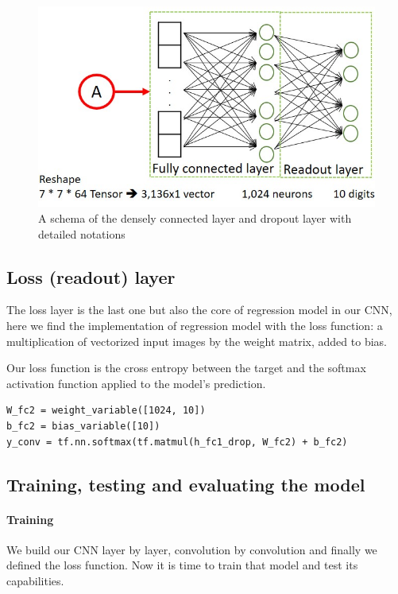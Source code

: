 \begin{figure}
	\caption{A schema of the densely connected layer and dropout layer with detailed notations}
	\label{fig:other_layers}
	\centering
	\includegraphics[width=1\textwidth]{Images/other_layers}
\end{figure}

\subsection{Loss (readout) layer}

The loss layer is the last one but also the core of regression model in our \acs{CNN}, here we find the implementation of regression model with the loss function: a multiplication of vectorized input images by the weight matrix, added to bias.

Our loss function is the cross entropy between the target and the softmax activation function applied to the model's prediction.

\begin{lstlisting}
W_fc2 = weight_variable([1024, 10])
b_fc2 = bias_variable([10])
y_conv = tf.nn.softmax(tf.matmul(h_fc1_drop, W_fc2) + b_fc2)
\end{lstlisting}

\subsection{Training, testing and evaluating the model}

\paragraph{Training}

We build our \acs{CNN} layer by layer, convolution by convolution and finally we defined the loss function. Now it is time to train that model and test its capabilities.

